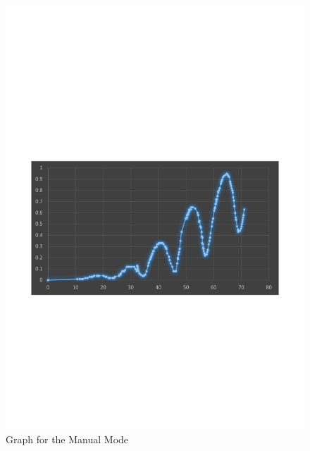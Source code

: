 	\begin{figure}[bth]
		\begin{center}
			\includegraphics[width=1.3\linewidth]{gfx/e2_result.pdf}
		\end{center}
	\caption[Graph for the Manual Mode]{Graph for the Manual Mode}
	\label{e2_result}
	\end{figure}

